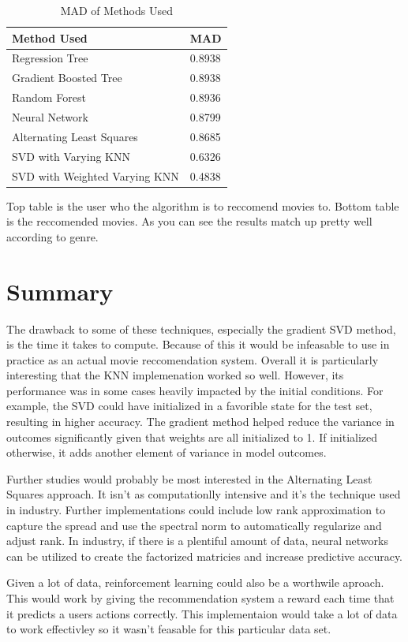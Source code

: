 \documentclass[review,onefignum,onetabnum]{siamart171218}
\begin{document}
\begin{table}[H]
\centering
\caption {MAD of Methods Used} \label{tab:title} 
\begin{tabular}{|l|l|}
\hline
Method Used & MAD \\ \hline
Regression Tree               & 0.8938 \\ \hline
Gradient Boosted Tree         & 0.8938 \\ \hline
Random Forest                 & 0.8936 \\ \hline
Neural Network                & 0.8799 \\ \hline
Alternating Least Squares         & 0.8685 \\ \hline
SVD  with Varying KNN         & 0.6326 \\ \hline
SVD with Weighted Varying KNN & 0.4838\\ \hline
\end{tabular}
\end{table}

Top table is the user who the algorithm is to reccomend movies to.
Bottom table is the reccomended movies. As you can see the results match up pretty well according to genre.

\section{Summary}
\label{sec:summary}

The drawback to some of these techniques, especially the gradient SVD method, is the time it takes to compute. Because of this it would be infeasable to use in practice as an actual movie reccomendation system. Overall it is particularly interesting that the KNN implemenation worked so well. However, its performance was in some cases heavily impacted by the initial conditions. For example, the SVD could have initialized in a favorible state for the test set, resulting in higher accuracy. The gradient method helped reduce the variance in outcomes significantly given that weights are all initialized to 1. If initialized otherwise, it adds another element of variance in model outcomes.

Further studies would probably be most interested in the Alternating Least Squares approach. It isn't as computationlly intensive and it's the technique used in industry. Further implementations could include low rank approximation to capture the spread and use the spectral norm to automatically regularize and adjust rank. In industry, if there is a plentiful amount of data, neural networks can be utilized to create the factorized matricies and increase predictive accuracy.

Given a lot of data, reinforcement learning could also be a worthwile aproach. This would work by giving the recommendation system a reward each time that it predicts a users actions correctly. This implementaion would take a lot of data to work effectivley so it wasn't feasable for this particular data set. 
\end{document}
